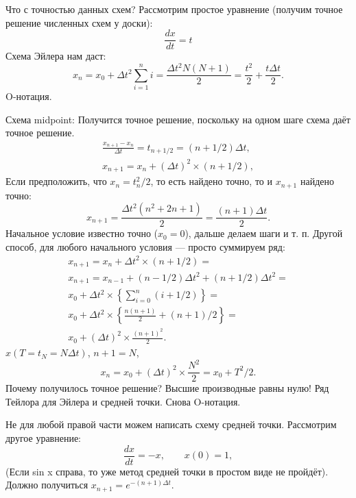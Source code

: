 \documentclass{book}
\begin{document}
Что с точностью данных схем? Рассмотрим простое уравнение (получим точное решение численных схем у
доски):
\begin{equation}
    \frac{dx}{dt} = t
\end{equation}
Схема Эйлера нам даст:
\begin{equation}
    x_n = x_0 + \Delta t^2 \sum_{i = 1}^n i = \frac{\Delta t^2 N (N + 1)}{2} = \frac{t^2}{2} +
    \frac{t \Delta t}{2}.
\end{equation}
O-нотация.

Схема midpoint:
Получится точное решение, поскольку на одном шаге схема даёт точное решение.
\begin{eqnarray}
    \frac{x_{n+1} - x_n}{\Delta t} = t_{n+1/2} = (n + 1/2) \Delta t, \\
    x_{n + 1} = x_n + (\Delta t )^2 \times (n + 1/2),
\end{eqnarray}
Если предположить, что $x_n = t_n^2 / 2$, то есть найдено точно, то и $x_{n + 1}$ найдено точно:
\begin{equation}
    x_{n + 1} = \frac{\Delta t^2 (n^2 + 2 n + 1)}{2} = \frac{(n + 1) \Delta t}{2}.
\end{equation}
Начальное условие известно точно ($x_0 = 0$), дальше делаем шаги и т. п.
Другой способ, для любого начального условия --- просто суммируем ряд:
\begin{eqnarray}
    x_{n + 1} = x_n + \Delta t^2 \times (n + 1/2) = \\
    x_{n + 1} = x_{n - 1} + (n - 1 /2) \Delta t^2 + (n + 1 / 2) \Delta t^2 = \\
    x_0 + \Delta t^2 \times \left\{ \sum_{i = 0}^n (i + 1/2) \right\} = \\
    x_0 + \Delta t^2 \times \left\{ \frac{n (n + 1)}{2} + (n + 1) / 2 \right\} = \\
    x_0 + (\Delta t)^2 \times \frac{(n + 1)^2}{2}.
\end{eqnarray}
$x(T = t_N = N \Delta t)$, $n + 1 = N$,
\begin{equation}
    x_n = x_0 +(\Delta t)^2 \times \frac{N^2}{2} = x_0 + T^2 / 2.
\end{equation}
Почему получилось точное решение? Высшие производные равны нулю! Ряд Тейлора для Эйлера и средней
точки. Снова O-нотация.

Не для любой правой части можем написать схему средней точки. Рассмотрим другое уравнение:
\begin{equation}
    \frac{dx}{dt} = -x, \qquad x(0) = 1,
\end{equation}
(Если sin x справа, то уже метод средней точки в простом виде не пройдёт).
Должно получиться $x_{n+1} = e^{-(n+1) \Delta t}$.
\end{document}
